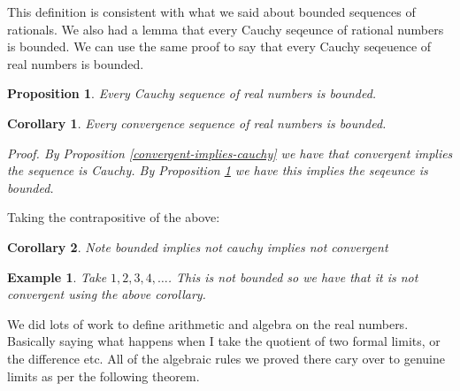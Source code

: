 \documentclass{article}
\newtheorem{example}{Example}[subsection]
\newtheorem{proposition}{Proposition}[subsection]
\newtheorem{corollary}{Corollary}[subsection]
\let\it\textit
\begin{document}
This definition is consistent with what we said about
bounded sequences of rationals. We also had 
a lemma that every Cauchy seqeunce of rational 
numbers is bounded. We can use the same
proof to say that every Cauchy seqeuence of real 
numbers is bounded.  

\begin{proposition}
\label{cauchy-implies-bounded}
	Every Cauchy sequence of real numbers is bounded.	
\end{proposition}

\begin{corollary}
\label{convergent-implies-bounded}
	Every convergence sequence of real numbers 
	is bounded.

	\it{Proof}. By Proposition \ref{convergent-implies-cauchy} 
	we have that convergent implies the sequence is Cauchy.
	By Proposition \ref{cauchy-implies-bounded} we have 
	this implies the seqeunce is bounded.
\end{corollary}

Taking the contrapositive of the above:

\begin{corollary}
	Note bounded implies not cauchy implies not convergent	
\end{corollary}

\begin{example}
	Take $1,2,3,4,\dots$. This is not bounded
	so we have that it is not convergent using 
	the above corollary.
\end{example}

We did lots of work to define arithmetic and algebra
on the real numbers. Basically saying what happens 
when I take the quotient of two formal limits, 
or the difference etc. All of the algebraic 
rules we proved there cary over to genuine
limits as per the following theorem.
\end{document}
